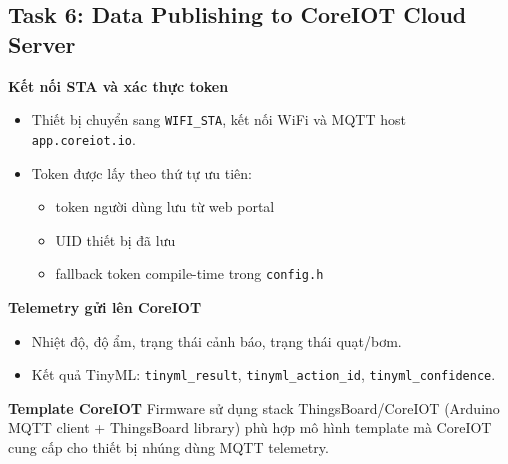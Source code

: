 \subsection{Task 6: Data Publishing to CoreIOT Cloud Server}
\textbf{Kết nối STA và xác thực token}
\begin{itemize}
    \item Thiết bị chuyển sang \texttt{WIFI\_STA}, kết nối WiFi và MQTT host \texttt{app.coreiot.io}.
    \item Token được lấy theo thứ tự ưu tiên:
    \begin{itemize}
        \item token người dùng lưu từ web portal
        \item UID thiết bị đã lưu
        \item fallback token compile-time trong \texttt{config.h}
    \end{itemize}
\end{itemize}

\textbf{Telemetry gửi lên CoreIOT}
\begin{itemize}
    \item Nhiệt độ, độ ẩm, trạng thái cảnh báo, trạng thái quạt/bơm.
    \item Kết quả TinyML: \texttt{tinyml\_result}, \texttt{tinyml\_action\_id}, \texttt{tinyml\_confidence}.
\end{itemize}

\textbf{Template CoreIOT}
Firmware sử dụng stack ThingsBoard/CoreIOT (Arduino MQTT client + ThingsBoard library) phù hợp mô hình template mà CoreIOT cung cấp cho thiết bị nhúng dùng MQTT telemetry.
